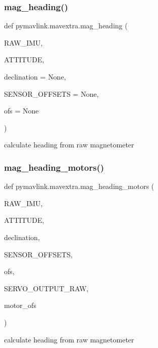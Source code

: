 \subsubsection{\texorpdfstring{mag\+\_\+heading()}{mag\_heading()}}
{\footnotesize\ttfamily def pymavlink.\+mavextra.\+mag\+\_\+heading (\begin{DoxyParamCaption}\item[{}]{R\+A\+W\+\_\+\+I\+MU,  }\item[{}]{A\+T\+T\+I\+T\+U\+DE,  }\item[{}]{declination = {\ttfamily None},  }\item[{}]{S\+E\+N\+S\+O\+R\+\_\+\+O\+F\+F\+S\+E\+TS = {\ttfamily None},  }\item[{}]{ofs = {\ttfamily None} }\end{DoxyParamCaption})}

\begin{DoxyVerb}calculate heading from raw magnetometer\end{DoxyVerb}
 \mbox{\label{namespacepymavlink_1_1mavextra_aed3e1ad61d9f219e180e9e3ac94764fe}} 
\subsubsection{\texorpdfstring{mag\+\_\+heading\+\_\+motors()}{mag\_heading\_motors()}}
{\footnotesize\ttfamily def pymavlink.\+mavextra.\+mag\+\_\+heading\+\_\+motors (\begin{DoxyParamCaption}\item[{}]{R\+A\+W\+\_\+\+I\+MU,  }\item[{}]{A\+T\+T\+I\+T\+U\+DE,  }\item[{}]{declination,  }\item[{}]{S\+E\+N\+S\+O\+R\+\_\+\+O\+F\+F\+S\+E\+TS,  }\item[{}]{ofs,  }\item[{}]{S\+E\+R\+V\+O\+\_\+\+O\+U\+T\+P\+U\+T\+\_\+\+R\+AW,  }\item[{}]{motor\+\_\+ofs }\end{DoxyParamCaption})}

\begin{DoxyVerb}calculate heading from raw magnetometer\end{DoxyVerb}
 \mbox{\label{namespacepymavlink_1_1mavextra_a38cfb9a7f119e04fd6abee84eaca3adc}} 
